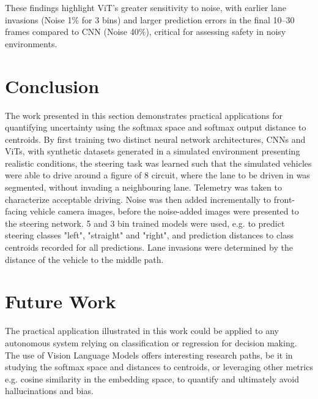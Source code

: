 These findings highlight ViT's greater sensitivity to noise, with earlier lane invasions (Noise 1\% for 3 bins) and larger prediction errors in the final 10–30 frames compared to CNN (Noise 40\%), critical for assessing safety in noisy environments.


\section{Conclusion}

The work presented in this section demonstrates practical applications for quantifying uncertainty using the softmax space and softmax output distance to centroids. By first training two distinct neural network architectures, CNNs and ViTs, with synthetic datasets generated in a simulated environment presenting realistic conditions, the steering task was learned such that the simulated vehicles were able to drive around a figure of 8 circuit, where the lane to be driven in was segmented, without invading a neighbouring lane. Telemetry was taken to characterize acceptable driving. Noise was then added incrementally to front-facing vehicle camera images, before the noise-added images were presented to the steering network. 5 and 3 bin trained models were used, e.g. to predict steering classes "left", "straight" and "right", and prediction distances to class centroids recorded for all predictions. Lane invasions were determined by the distance of the vehicle to the middle path.

\section{Future Work}

The practical application illustrated in this work could be applied to any autonomous system relying on classification or regression for decision making. The use of Vision Language Models offers interesting research paths, be it in studying the softmax space and distances to centroids, or leveraging other metrics e.g. cosine similarity in the embedding space, to quantify and ultimately avoid hallucinations and bias.

